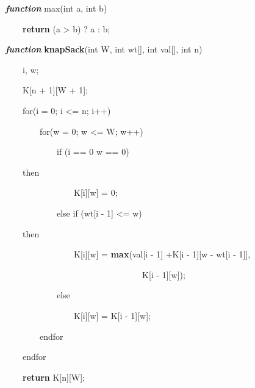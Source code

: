 \documentclass[letterpaper]{article}
\begin{document}
\begin{multicols}{2}
\bigskip

\textbf{\textit{\textcolor[rgb]{0.2509804,0.25882354,0.30588236}{function}}}\textcolor[rgb]{0.2509804,0.25882354,0.30588236}{
max(int a, int b)}

\textcolor[rgb]{0.2509804,0.25882354,0.30588236}{\ \ \ \ }\textbf{\textcolor[rgb]{0.2509804,0.25882354,0.30588236}{return}}\textcolor[rgb]{0.2509804,0.25882354,0.30588236}{
(a {\textgreater} b) ? a : b;}

\textbf{\textit{\textcolor[rgb]{0.2509804,0.25882354,0.30588236}{function}}}\textcolor[rgb]{0.2509804,0.25882354,0.30588236}{
}\textbf{\textcolor[rgb]{0.2509804,0.25882354,0.30588236}{knapSack}}\textcolor[rgb]{0.2509804,0.25882354,0.30588236}{(int
W, int wt[], int val[], int n)}

{\color[rgb]{0.2509804,0.25882354,0.30588236}
\ \ \ \ i, w;}

{\color[rgb]{0.2509804,0.25882354,0.30588236}
\ \ \ \ K[n + 1][W + 1];}

{\color[rgb]{0.2509804,0.25882354,0.30588236}
\ \ \ \ for(i = 0; i {\textless}= n; i++)}

{\color[rgb]{0.2509804,0.25882354,0.30588236}
\ \ \ \ \ \ \ \ for(w = 0; w {\textless}= W; w++)}

{\color[rgb]{0.2509804,0.25882354,0.30588236}
\ \ \ \ \ \ \ \ \ \ \ \ if (i == 0 {\textbar}{\textbar} w == 0)}

{\color[rgb]{0.2509804,0.25882354,0.30588236}
\ \ \ \  then}

{\color[rgb]{0.2509804,0.25882354,0.30588236}
\ \ \ \ \ \ \ \ \ \ \ \ \ \ \ \ K[i][w] = 0;}

{\color[rgb]{0.2509804,0.25882354,0.30588236}
\ \ \ \ \ \ \ \ \ \ \ \ else if (wt[i - 1] {\textless}= w)}

{\color[rgb]{0.2509804,0.25882354,0.30588236}
\ \ \ \  then}

\textcolor[rgb]{0.2509804,0.25882354,0.30588236}{\ \ \ \ \ \ \ \ \ \ \ \ \ \ \ \ K[i][w] =
}\textbf{\textcolor[rgb]{0.2509804,0.25882354,0.30588236}{max}}\textcolor[rgb]{0.2509804,0.25882354,0.30588236}{(val[i
- 1] +K[i - 1][w - wt[i - 1]],}

{\color[rgb]{0.2509804,0.25882354,0.30588236}
\ \ \ \ \ \ \ \ \ \ \ \ \ \ \ \ \ \ \ \ \ \ \ \ \ \ \ \ \ \ \ \ K[i - 1][w]);}

{\color[rgb]{0.2509804,0.25882354,0.30588236}
\ \ \ \ \ \ \ \ \ \ \ \ else}

{\color[rgb]{0.2509804,0.25882354,0.30588236}
\ \ \ \ \ \ \ \ \ \ \ \ \ \ \ \ K[i][w] = K[i - 1][w];}

{\color[rgb]{0.2509804,0.25882354,0.30588236}
\ \ \ \ \ \ \ \ endfor}

{\color[rgb]{0.2509804,0.25882354,0.30588236}
\ \ \ \ endfor}

\textcolor[rgb]{0.2509804,0.25882354,0.30588236}{\ \ \ \ }\textbf{\textcolor[rgb]{0.2509804,0.25882354,0.30588236}{return}}\textcolor[rgb]{0.2509804,0.25882354,0.30588236}{
K[n][W];}
\end{multicols}
\end{document}
